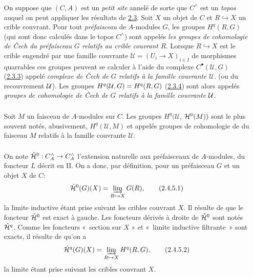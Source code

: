 \documentclass[10pt]{../fichiers-configuration-latex/smfart}
\begin{document}
\subsubsection{}
On suppose que $(C, A)$ est un \emph{petit site} annelé de sorte que
$C^{\wedge}$ est un \emph{topos} auquel on peut
appliquer les résultats de \hyperref[V.subsec2.3]{2.3}. Soit $X$ un objet de $C$ et $R
\hookrightarrow X$ un crible couvrant. Pour tout \emph{préfaisceau}
de $A$-modules $G$, les groupes $H^{q}(R, G)$ (qui sont donc
calculés dans le topos $C^{\wedge}$) sont appelés
\emph{les groupes de cohomologie de Čech du préfaisceau
  $G$ relatifs au crible couvrant $R$.}
Lorsque $R \hookrightarrow X$ est le crible engendré par une famille
couvrante $\mathcal{U} = (U_i \to X)_{i \in I}$ de
morphismes quarrables ces groupes peuvent se calculer à l'aide du
complexe $C^{∙}(\mathcal{U}, G)$ (\hyperref[V.subsubsec2.3.3]{2.3.3}) appelé \emph{complexe de
  Čech de $G$ relatifs à la famille couvrante $\mathcal{U}$.} (ou
du recouvrement ${\mathcal U}$). Les groupes
$H^{q}({\mathcal U},G)=H^{q}(R,G)$ (\hyperref[V.prop2.3.4]{2.3.4}) sont alors appelés
\emph{groupes de cohomologie de Čech de $G$ relatifs à la famille
  couvrante ${\mathcal U}$}.

\subsubsection{}
Soit $M$ un faisceau de $A$-modules sur $C$. Les groupes
$H^q(\mathcal{U}$, ${\mathcal H}^{0}(M))$ sont le plus souvent
notés, abusivement, $H^q(\mathcal{U}, M)$ et appelés groupes de
cohomologie de  du faisceau $M$ relatifs à la famille couvrante
$\mathcal{U}$.

\subsubsection{}
On note $\check{\Hh}^0 : C^{\wedge}_A \to
C^{\wedge}_A$ l'extension naturelle aux préfaisceaux
de $A$-modules, du foncteur $L$ décrit en II. On a donc, par
définition, pour un préfaisceau $G$ et un objet $X$ de $C$:
\begin{equation}
\check{{\mathcal H}}^0 (G) (X) = \varinjlim_{R \hookrightarrow X}
G(R){},\tag{2.4.5.1}
\end{equation}
la limite inductive étant prise suivant les cribles couvrant $X$. Il
résulte de  que le foncteur $\check{{\mathcal H}}^{0}$
est exact à gauche. Les foncteurs dérivés à droite de
$\check{{\mathcal H}}^{0}$ sont notés
$\check{{\mathcal H}}^{q}$. Comme les foncteurs « section sur $X$ »
et « limite inductive filtrante » sont exacts, il résulte de
 qu'on a
\begin{equation}
\check{{\mathcal H}}^{q} (G) (X) = \varinjlim_{R \hookrightarrow
  X} H^q(R, G){},\tag{2.4.5.2}
\end{equation}
la limite étant prise suivant les cribles couvrant $X$.
\end{document}
